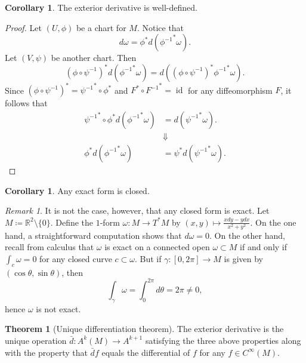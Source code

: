 \documentclass[10pt,letterpaper,cm]{nupset}
\theoremstyle{definition}
\theoremstyle{theorem}
\newtheorem{theorem}[definition]{Theorem}
\newtheorem{corollary}[definition]{Corollary}
\theoremstyle{remark}
\newtheorem{remark}[definition]{Remark}
\newcommand{\R}{\mathbb R}
\newcommand{\1}{\mathbf{1}}
\newcommand{\0}{\vec 0}
\DeclareMathOperator{\id}{id}
\begin{document}
\begin{corollary}
The exterior derivative is well-defined.
\end{corollary}
\begin{proof}
Let $(U, \phi)$ be a chart for $M$. Notice that $$d\omega = \phi^{\ast} d\left({\phi^{-1}}^{\ast}\omega\right).$$ Let $(V, \psi)$ be another chart. Then $$ \left(\phi \circ \psi^{-1}\right)^{\ast} d\left({\phi^{-1}}^{\ast} \omega\right) =  d\left( \left(\phi \circ \psi^{-1}\right)^{\ast}{\phi^{-1}}^{\ast} \omega\right).$$ Since $\left(\phi \circ \psi^{-1}\right)^{\ast} = {\psi^{-1}}^{\ast} \circ \phi^{\ast}$ and $F^{\ast} \circ {F^{-1}}^{\ast}= \id$ for any diffeomorphism $F$, 
it follows that 
\begin{align*}
{\psi^{-1}}^{\ast} \circ \phi^{\ast}d\left({\phi^{-1}}^{\ast} \omega\right) & = d\left({\psi^{-1}}^{\ast} \omega\right).
\\  & \Downarrow
 \\  \phi^{\ast}d\left({\phi^{-1}}^{\ast} \omega\right) & = \psi^{\ast} d\left({\psi^{-1}}^{\ast} \omega\right).
 \end{align*}
\end{proof}

\begin{corollary}
Any exact form is closed.
\end{corollary}

\begin{remark}\label{ce}
It is not the case, however, that any closed form is exact. Let $M\coloneqq  \R^2 \setminus \{0\}$. Define the $1$-form $\omega : M \to T^{\ast}M$ by $(x, y) \mapsto \frac{xdy - y dx}{x^2 + y^2}$. On the one hand, a straightforward computation shows that $d \omega =0$. On the other hand, recall from calculus that $\omega$ is exact on a connected open $\omega \subset M$ if and only if $\int_c \omega =0$ for any closed curve $c \subset \omega$. But if $\gamma : [0, 2\pi] \to M$ is given by $\left(\cos \theta, \sin \theta\right)$, then  $$ \int_{\gamma} \omega = \int_{0}^{2\pi} d\theta = 2\pi \ne 0 ,$$ hence $\omega$ is not exact.
\end{remark}

\begin{theorem}[Unique differentiation theorem]
The exterior derivative is the unique operation $\bar{d} : A^k(M) \to A^{k+1}$ satisfying the three above properties along with the property that $\bar{d} f $ equals the differential of $f$ for any $f \in C^{\infty}(M)$.
\end{theorem}
\end{document}
